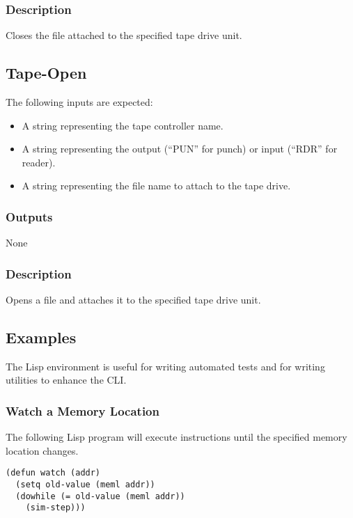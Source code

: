 \documentclass[10pt, openany]{book}
\begin{document}
\subsubsection{Description}
Closes the file attached to the specified tape drive unit.

\subsection{Tape-Open}
The following inputs are expected:
\begin{itemize}
  \item A string representing the tape controller name.
  \item A string representing the output (``PUN'' for punch) or input (``RDR'' for reader).
  \item A string representing the file name to attach to the tape drive.
\end{itemize}
\subsubsection{Outputs}
None
\subsubsection{Description}
Opens a file and attaches it to the specified tape drive unit.

\subsection{Examples}
The Lisp environment is useful for writing automated tests and for writing utilities to enhance the CLI.
\subsubsection{Watch a Memory Location}
The following Lisp program will execute instructions until the specified memory location changes.
\lstset{language=[Tiny]Lisp}
\begin{lstlisting}
(defun watch (addr)
  (setq old-value (meml addr))
  (dowhile (= old-value (meml addr))
    (sim-step)))
\end{lstlisting}

\clearpage
{}
\nocite{m68000a}
\nocite{m68000b}
\nocite{i8080}


\end{document}
